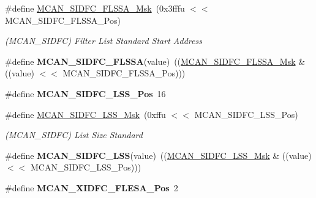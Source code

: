 \begin{DoxyCompactItemize}
\#define \mbox{\hyperlink{group__SAMV71__MCAN_ga32274be4ecd43f1fc702770906fb00cb}{M\+C\+A\+N\+\_\+\+S\+I\+D\+F\+C\+\_\+\+F\+L\+S\+S\+A\+\_\+\+Msk}}~(0x3fffu $<$$<$ M\+C\+A\+N\+\_\+\+S\+I\+D\+F\+C\+\_\+\+F\+L\+S\+S\+A\+\_\+\+Pos)
\begin{DoxyCompactList}\small\item\em (M\+C\+A\+N\+\_\+\+S\+I\+D\+FC) Filter List Standard Start Address \end{DoxyCompactList}\item 
\mbox{\label{group__SAMV71__MCAN_ga21486405b3a818f664a47f7a94057ec0}} 
\#define {\bfseries M\+C\+A\+N\+\_\+\+S\+I\+D\+F\+C\+\_\+\+F\+L\+S\+SA}(value)~((\mbox{\hyperlink{group__SAMV71__MCAN_ga32274be4ecd43f1fc702770906fb00cb}{M\+C\+A\+N\+\_\+\+S\+I\+D\+F\+C\+\_\+\+F\+L\+S\+S\+A\+\_\+\+Msk}} \& ((value) $<$$<$ M\+C\+A\+N\+\_\+\+S\+I\+D\+F\+C\+\_\+\+F\+L\+S\+S\+A\+\_\+\+Pos)))
\item 
\mbox{\label{group__SAMV71__MCAN_ga3eee89e9d10db90dad7a58515e8ea7e0}} 
\#define {\bfseries M\+C\+A\+N\+\_\+\+S\+I\+D\+F\+C\+\_\+\+L\+S\+S\+\_\+\+Pos}~16
\item 
\mbox{\label{group__SAMV71__MCAN_ga1e2bedadca91b09be2fcdbe51235b2d3}} 
\#define \mbox{\hyperlink{group__SAMV71__MCAN_ga1e2bedadca91b09be2fcdbe51235b2d3}{M\+C\+A\+N\+\_\+\+S\+I\+D\+F\+C\+\_\+\+L\+S\+S\+\_\+\+Msk}}~(0xffu $<$$<$ M\+C\+A\+N\+\_\+\+S\+I\+D\+F\+C\+\_\+\+L\+S\+S\+\_\+\+Pos)
\begin{DoxyCompactList}\small\item\em (M\+C\+A\+N\+\_\+\+S\+I\+D\+FC) List Size Standard \end{DoxyCompactList}\item 
\mbox{\label{group__SAMV71__MCAN_gac0d6e5712a4a4b7f09be6a4740f753d6}} 
\#define {\bfseries M\+C\+A\+N\+\_\+\+S\+I\+D\+F\+C\+\_\+\+L\+SS}(value)~((\mbox{\hyperlink{group__SAMV71__MCAN_ga1e2bedadca91b09be2fcdbe51235b2d3}{M\+C\+A\+N\+\_\+\+S\+I\+D\+F\+C\+\_\+\+L\+S\+S\+\_\+\+Msk}} \& ((value) $<$$<$ M\+C\+A\+N\+\_\+\+S\+I\+D\+F\+C\+\_\+\+L\+S\+S\+\_\+\+Pos)))
\item 
\mbox{\label{group__SAMV71__MCAN_ga9128a13c042981e9e0a23d9b73577a9d}} 
\#define {\bfseries M\+C\+A\+N\+\_\+\+X\+I\+D\+F\+C\+\_\+\+F\+L\+E\+S\+A\+\_\+\+Pos}~2

\end{DoxyCompactItemize}
